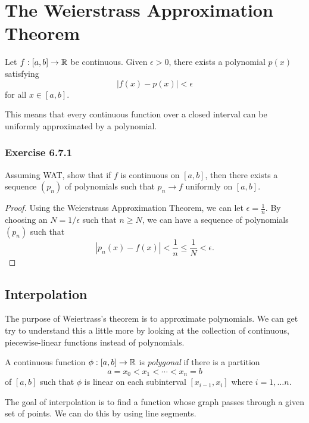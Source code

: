 \section{The Weierstrass Approximation Theorem}

\begin{theorem}
        Let \( f: [a,b] \to \mathbb{R}  \) be continuous. Given \( \epsilon > 0  \), there exists a polynomial \( p(x) \) satisfying 
        \[  | f(x) - p(x) | < \epsilon \] for all \( x \in [a,b] \).
    \end{theorem}

This means that every continuous function over a closed interval can be uniformly approximated by a polynomial.

\subsubsection{Exercise 6.7.1} Assuming WAT, show that if \( f \) is continuous on \( [a,b] \), then there exists a sequence \( (p_n) \) of polynomials such that \( p_n \to f  \) uniformly on \( [a,b] \).

\begin{proof}
    Using the Weierstrass Approximation Theorem, we can let \( \epsilon  = \frac{ 1 }{ n }  \). By choosing an \( N = 1 / \epsilon   \) such that \( n \geq N  \), we can have a sequence of polynomials \( (p_n) \) such that 
    \[ | p_{n}(x) - f(x)  | < \frac{ 1 }{ n  } \leq \frac{ 1 }{ N } < \epsilon.  \]
\end{proof}

\subsection{Interpolation}

The purpose of Weiertrass's theorem is to approximate polynomials. We can get try to understand this a little more by looking at the collection of continuous, piecewise-linear functions instead of polynomials.

\begin{definition}
    A continuous function \( \phi : [a,b] \to \mathbb{R}  \) is \textit{polygonal} if there is a partition 
    \[  a = x_{0} < x_{1} < \dotsb < x_{n} = b   \] of \( [a,b] \) such that \( \phi  \) is linear on each subinterval \( [x_{i-1}, x_{i}] \) where \(  i = 1, \dots n. \)
\end{definition}

The goal of interpolation is to find a function whose graph passes through a given set of points. We can do this by using line segments.

